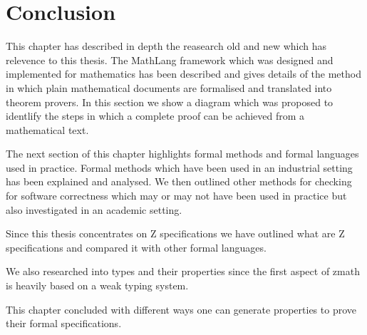 \section{Conclusion}
This chapter has described in depth the reasearch old and new which has relevence to this thesis. The MathLang framework which was designed and implemented for mathematics has been described and gives details of the method in which plain mathematical documents are formalised and translated into theorem provers. In this section we show a diagram which was proposed to identlify the steps in which a complete proof can be achieved from a mathematical text. 

The next section of this chapter highlights formal methods and formal languages used in practice. Formal methods which have been used in an industrial setting has been explained and analysed. We then outlined other methods for checking for software correctness which may or may not have been used in practice but also investigated in an academic setting.

Since this thesis concentrates on Z specifications we have outlined what are Z specifications and compared it with other formal languages. 

We also researched into types and their properties since the first aspect of \gls{zmath} is heavily based on a weak typing system.

This chapter concluded with different ways one can generate properties to prove their formal specifications.
